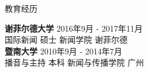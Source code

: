 \documentclass{resume} %
\begin{document}

\begin{rSection}{教育经历}

\vspace{-0.5em}
{\bf 谢菲尔德大学} \hfill 2016年9月 - 2017年11月
\vspace{-0.3em} \\
国际新闻 硕士 新闻学院 \hfill 谢菲尔德
\vspace{-0.3em} \\
{\bf 暨南大学} \hfill 2010年9月 - 2014年7月
\vspace{-0.3em} \\
播音与主持 本科 新闻与传播学院 \hfill 广州
\vspace{-0.5em}

\end{rSection}

\end{document}
